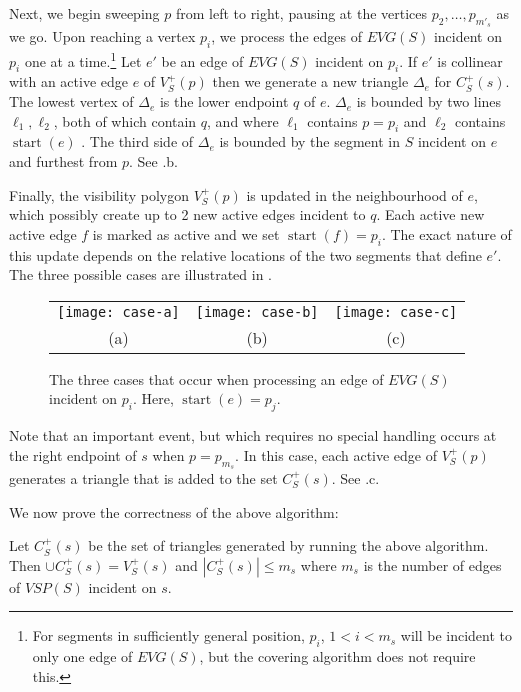 \documentclass{patmorin}
\newcommand{\EVG}{\mathit{EVG}}
\newcommand{\VSP}{\mathit{VSP}}
\DeclareMathOperator{\start}{start}
\begin{document}
Next, we begin sweeping $p$ from left to right, pausing at the vertices
$p_2,\ldots,p_{m'_s}$ as we go.  Upon reaching a vertex $p_i$, we process
the edges of $\EVG(S)$ incident on $p_i$ one at a time.\footnote{For
segments in sufficiently general position, $p_i$, $1<i<m_s$ will be
incident to only one edge of $\EVG(S)$, but the covering algorithm does not
require this.}  Let $e'$ be an edge of $\EVG(S)$ incident on $p_i$. If $e'$
is collinear with an active edge $e$ of $V^+_S(p)$ then we generate a new
triangle $\Delta_e$ for $C^+_S(s)$.  The lowest vertex of $\Delta_e$ is the
lower endpoint $q$ of $e$. $\Delta_e$ is bounded by two lines
$\ell_1,\ell_2$, both of which contain $q$, and where $\ell_1$ contains
$p=p_i$ and $\ell_2$ contains $\start(e)$ .  The third side of $\Delta_e$
is bounded by the segment in $S$ incident on $e$ and furthest from $p$. See
.b.

Finally, the visibility polygon $V^+_S(p)$ is updated in the
neighbourhood of $e$, which possibly create up to 2 new active edges
incident to $q$.  Each active new active edge $f$ is marked as active
and we set $\start(f)=p_i$.  The exact nature of this update depends on
the relative locations of the two segments that define $e'$.  The three
possible cases are illustrated in .

\begin{figure}
  \begin{center}
    \begin{tabular}{|c|c|c|}
      \texttt{[image: case-a]} &
      \texttt{[image: case-b]} &
      \texttt{[image: case-c]} \\
      (a) & (b) & (c)
    \end{tabular}
  \end{center}
  \caption{The three cases that occur when processing an edge of $\EVG(S)$
incident on $p_i$.  Here, $\start(e)=p_j$.}
\end{figure}

Note that an important event, but which requires no special handling occurs
at the right endpoint of $s$ when $p=p_{m_s}$.  In this case, each active
edge of $V^+_S(p)$ generates a triangle that is added to the set $C^+_S(s)$.
See .c.

We now prove the correctness of the above algorithm:

\begin{lem}
Let $C^+_S(s)$ be the set of triangles generated by running the above
algorithm.  Then $\cup C^+_S(s) = V^+_S(s)$ and $|C^+_S(s)|\le m_s$ where
$m_s$ is the number of edges of $\VSP(S)$ incident on $s$.
\end{lem}
\end{document}
